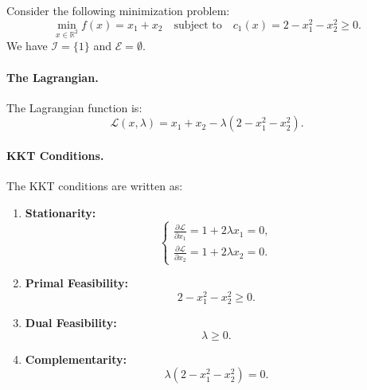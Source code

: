 \begin{exemple}
    Consider the following minimization problem:
    \begin{equation}
        \min_{x \in \mathbb{R}^2} f(x) = x_1 + x_2 \quad \text{subject to} \quad c_1(x) = 2 - x_1^2 - x_2^2 \geq 0.
    \end{equation}
    We have $\mathcal{I} = \{1\}$ and $\mathcal{E} = \emptyset$.
    
    \paragraph{The Lagrangian.}
    The Lagrangian function is:
    \begin{equation}
        \mathcal{L}(x, \lambda) = x_1 + x_2 - \lambda(2 - x_1^2 - x_2^2).
    \end{equation}
    
    \paragraph{KKT Conditions.}
    The KKT conditions are written as:
    \begin{enumerate}
        \item \textbf{Stationarity:}
        \begin{equation}
            \begin{cases}
                \displaystyle \frac{\partial \mathcal{L}}{\partial x_1} = 1 + 2\lambda x_1 = 0, \\[8pt]
                \displaystyle \frac{\partial \mathcal{L}}{\partial x_2} = 1 + 2\lambda x_2 = 0.
            \end{cases}
        \end{equation}
        
        \item \textbf{Primal Feasibility:}
        \begin{equation}
            2 - x_1^2 - x_2^2 \geq 0.
        \end{equation}
        
        \item \textbf{Dual Feasibility:}
        \begin{equation}
            \lambda \geq 0.
        \end{equation}
        
        \item \textbf{Complementarity:}
        \begin{equation}
            \lambda(2 - x_1^2 - x_2^2) = 0.
        \end{equation}
    \end{enumerate}
    

\end{exemple}

